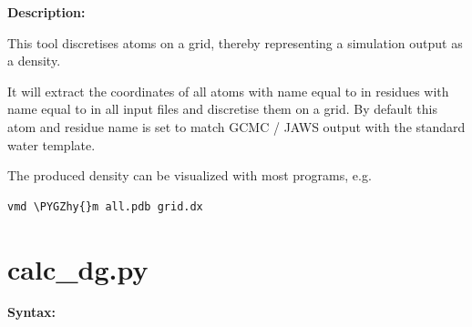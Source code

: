 \documentclass[letterpaper,10pt,english]{sphinxmanual}
\def\PYGZhy{\char`\-}
\begin{document}
\textbf{Description:}

This tool discretises atoms on a grid, thereby representing a simulation output as a density.

It will extract the coordinates of all atoms with name equal to  in residues with name equal to  in all input files and discretise them on a grid. By default this atom and residue name is set to match GCMC / JAWS output with the standard water template.

The produced density can be visualized with most programs, e.g.

\begin{Verbatim}[commandchars=\\\{\}]
vmd \PYGZhy{}m all.pdb grid.dx
\end{Verbatim}


\section{calc\_dg.py}
\label{tools:calc-dg-py}
\textbf{Syntax:}
\end{document}
